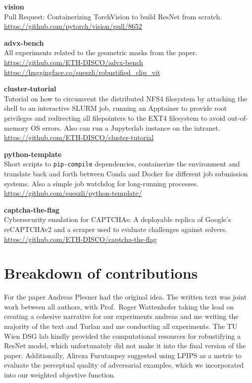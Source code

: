 \documentclass[a4paper, oneside]{discothesis}
\newcommand{\linebreaks}{\vspace*{0.5em}} %
\begin{document}
\linebreaks

\textbf{vision} \\
Pull Request: Containerizing TorchVision to build ResNet from scratch. \\
\url{https://github.com/pytorch/vision/pull/8652}

\linebreaks

\textbf{advx-bench} \\
All experiments related to the geometric masks from the paper. \\
\url{https://github.com/ETH-DISCO/advx-bench} \\
\url{https://huggingface.co/sueszli/robustified_clip_vit}

\linebreaks

\textbf{cluster-tutorial} \\
Tutorial on how to circumvent the distributed NFS4 filesystem by attaching the shell to an interactive SLURM job, running an Apptainer to provide root privileges and redirecting all filepointers to the EXT4 filesystem to avoid out-of-memory OS errors. Also can run a Jupyterlab instance on the intranet. \\
\url{https://github.com/ETH-DISCO/cluster-tutorial}

\linebreaks

\textbf{python-template} \\
Short scripts to \texttt{pip-compile} dependencies, containerize the environment and translate back and forth between Conda and Docker for different job submission systems. Also a simple job watchdog for long-running processes. \\ 
\url{https://github.com/sueszli/python-template/}

\linebreaks

\textbf{captcha-the-flag} \\
Cybersecurity emulation for CAPTCHAs: A deployable replica of Google's reCAPTCHAv2 and a scraper used to evaluate challenges against solvers. \\
\url{https://github.com/ETH-DISCO/captcha-the-flag}

\section*{Breakdown of contributions}

For the paper Andreas Plesner had the original idea. The written text was joint work between all authors, with Prof.\ Roger Wattenhofer taking the lead on creating a cohesive narrative for our experiments andreas and me writing the majority of the text and Turlan and me conducting all experiments. The TU Wien DSG lab kindly provided the computational resources for robustifying a ResNet model, which unfortunately did not make it into the final version of the paper. Additionally, Alireza Furutanpey suggested using LPIPS as a metric to evaluate the perceptual quality of adversarial examples, which we incorporated into our weighted objective function.
\end{document}
